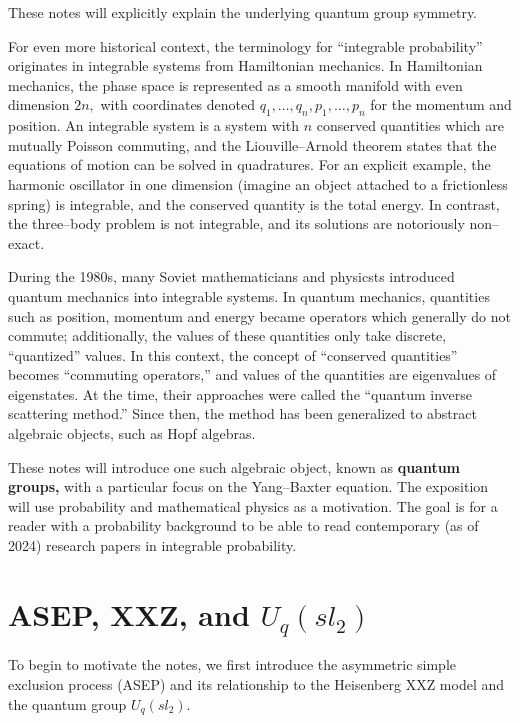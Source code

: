 \documentclass{ximera}
\begin{document}
\noindent These notes will explicitly explain the underlying 
quantum group symmetry. 

For even more historical context, the terminology for ``integrable probability''
originates in integrable systems from Hamiltonian mechanics.
In Hamiltonian mechanics, the phase space is represented as a smooth manifold with even dimension $2n,$
with coordinates denoted $q_1,\ldots,q_n,p_1,\ldots,p_n$ for the momentum and position. An integrable
system is a system with $n$ conserved quantities which are mutually Poisson commuting, 
and the Liouville--Arnold theorem states that the equations of motion can be solved in quadratures. For an explicit example, the harmonic oscillator in 
one dimension (imagine an object attached to a frictionless spring) is integrable, and the conserved quantity
is the total energy. In contrast, the three--body problem is not integrable, and its solutions are 
notoriously non--exact. 

During the 1980s, many Soviet mathematicians and physicsts introduced quantum mechanics into integrable
systems. In quantum mechanics, quantities such as position, momentum and energy became operators which 
generally do not commute; additionally, the values of these quantities only take discrete, ``quantized''
values. In this context, the concept of ``conserved quantities'' becomes ``commuting operators,'' and 
values of the quantities are eigenvalues of eigenstates. At the time, their approaches were called the
``quantum inverse scattering method.'' Since then, the method has been generalized to abstract 
algebraic objects, such as Hopf algebras. 

These notes will introduce one such algebraic object, known as \textbf{quantum groups,} with a particular
focus on the Yang--Baxter equation. The exposition will use probability and mathematical physics as a
motivation. The goal is for a reader with a probability background to be able to read contemporary (as of
2024) research papers in integrable probability. 



\section{ASEP, XXZ, and $U_q(sl_2)$}

To begin to motivate the notes, we first introduce the asymmetric simple exclusion process (ASEP) and its relationship to 
the Heisenberg XXZ model and the quantum group $U_q(sl_2).$ 
\end{document}
